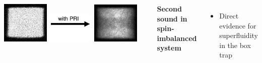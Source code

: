 \documentclass[26pt, paperwidth=36in,paperheight=48in]{tikzposter} %
\newcommand{\myfont}{\fontsize{26}{40}\selectfont}
\begin{document}
\begin{columns}
{	\vspace{2.0cm}
	\begin{minipage}{0.4\textwidth}
		\hspace{1.0cm}
		\vspace{1.0cm}
		\includegraphics[width=0.3\textwidth]{figures_retreat/box_abs_sound_A.png}
		\includegraphics[width=0.3\textwidth]{figures_retreat/with_PRI.png}
		\includegraphics[width=0.3\textwidth]{figures_retreat/pr_sound_A.png}
	\end{minipage}	
	
	\vspace{1.0cm}
	\begin{minipage}{0.3\textwidth}
		\flushleft
		\textbf{Second sound in spin-imbalanced system}
		\vspace{0.5cm}
		\myfont
		\begin{itemize}
			\item Direct evidence for superfluidity in the box trap
			

\end{itemize}
\end{minipage}}
\end{columns}
\end{document}
